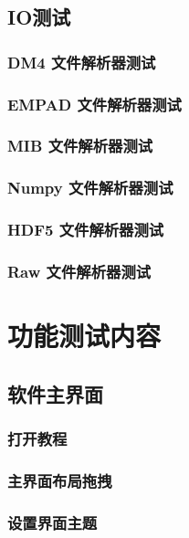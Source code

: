 \documentclass[a4paper,12pt]{report}	%
\begin{document}
\section{IO测试}

\subsection{DM4 文件解析器测试}

\subsection{EMPAD 文件解析器测试}

\subsection{MIB 文件解析器测试}

\subsection{Numpy 文件解析器测试}

\subsection{HDF5 文件解析器测试}

\subsection{Raw 文件解析器测试}

\chapter{功能测试内容}

\section{软件主界面}

\subsection{打开教程}

\subsection{主界面布局拖拽}

\subsection{设置界面主题}
\end{document}
